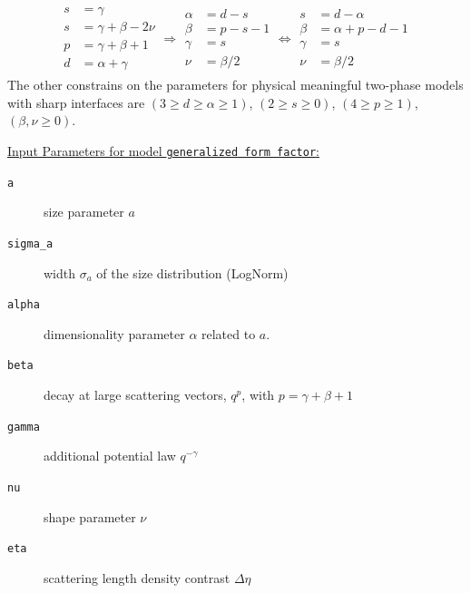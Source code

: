 \begin{align}\label{eq:lesser_generalizedFFparameters}
\begin{array}{rl}
  s &= \gamma \\
 s &= \gamma + \beta -2\nu \\
 p &= \gamma+\beta+1 \\
 d &= \alpha+\gamma
\end{array}
\Rightarrow
\begin{array}{rl}
 \alpha &= d-s \\
 \beta &= p-s-1 \\
 \gamma &= s \\
 \nu &=\beta/2
\end{array}
\Leftrightarrow
\begin{array}{rl}
 s &= d-\alpha \\
 \beta &= \alpha+p-d-1 \\
 \gamma &= s \\
 \nu &=\beta/2
\end{array}
\end{align}
The other constrains on the parameters for physical meaningful two-phase models with sharp interfaces are $(3\geq d\geq \alpha\geq 1)$,  $(2\geq s\geq 0)$, $(4\geq p \geq 1)$, $(\beta,\nu\geq 0)$.

\vspace{5mm}

\underline{Input Parameters for model \texttt{generalized form factor}:}\\
\begin{description}
\item[\texttt{a}] size parameter $a$
\item[\texttt{sigma\_a}] width $\sigma_a$ of the size distribution (LogNorm)
\item[\texttt{alpha}] dimensionality parameter $\alpha$ related to $a$.
\item[\texttt{beta}] decay at large scattering vectors, $q^p$, with $p=\gamma+\beta+1$
\item[\texttt{gamma}] additional potential law $q^{-\gamma}$
\item[\texttt{nu}] shape parameter $\nu$
\item[\texttt{eta}] scattering length density contrast $\Delta\eta$
\end{description}

\vspace{5mm}

